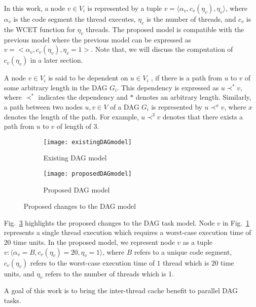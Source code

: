 In this work, a node ${v \in V_i}$ is represented by a tuple ${v = \langle \alpha_{v}, c_{v}(\eta_{v}), \eta_{v} \rangle }$, where $\alpha_{v}$ is the code segment the thread executes, $\eta_{v}$ is the number of threads, and ${c_{v}}$ is the WCET function for ${\eta_v}$ threads. The proposed model is  compatible with the previous model \cite{li2014analysis} where the previous model can be expressed as ${v = <\alpha_{v}, c_{v}(\eta_v), \eta_v=1>}$. Note that, we will discuss the computation of $c_{v}(\eta_{v})$ in a later section.

A node $v \in V_i$ is said to be dependent on $u \in V_i$ , if there is a path from $u$ to $v$ of some arbitrary length in the DAG $G_i$. This dependency is expressed as \textbf{${u \prec^* v}$}, where $\prec^*$ indicates the dependency and $*$ denotes an arbitrary length. Similarly, a path between two nodes $u, v \in V$ of a DAG $G_i$ is represented by $u \prec^{x} v$, where $x$ denotes the length of the path. For example, $u \prec^{3} v$ denotes that there exists a path from $u$ to $v$ of length of 3.


\begin{figure}
  \centering
  \begin{subfigure}[b]{0.4\textwidth}{
      \texttt{[image: existingDAGmodel]}
      \caption{Existing DAG model}
      \label{fig:existingDAGmodel}
    }
  \end{subfigure} \quad
  \begin{subfigure}[b]{0.4\textwidth}{
      \texttt{[image: proposedDAGmodel]}
      \caption{Proposed DAG model}
      \label{fig:proposedDAGmodel}
    }
  \end{subfigure}
  \caption{Proposed changes to the DAG model}
  \label{fig:dag-change}
\end{figure}


Fig.~\ref{fig:dag-change} highlights the proposed changes to the DAG task model.  Node $v$ in Fig.~\ref{fig:existingDAGmodel} represents a single thread execution which requires a worst-case execution time of $20$ time units. In the proposed model, we represent node $v$ as a tuple $v : \langle \alpha_v = B, c_v(\eta_v) = 20,  \eta_v = 1\rangle$, where $B$ refers to a unique code segment, $ c_v(\eta_v)$ refers to the worst-case execution time of $1$ thread which is $20$ time units, and $\eta_v$ refers to the number of threads which is 1.

 A goal of this work is to bring the inter-thread cache benefit \addcite to parallel DAG tasks. 

